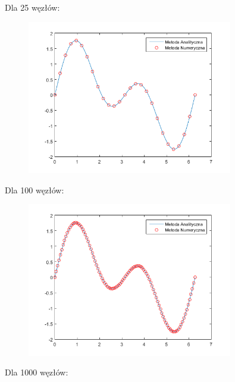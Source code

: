 Dla 25 węzłów:

\begin{figure}[!ht]
	\begin{center}
		\includegraphics[width=0.8\textwidth]{Lab3/charts/zad1/25.png}
	\end{center}
\end{figure}

\newpage

Dla 100 węzłów:
	

\begin{figure}[!ht]
	\begin{center}
		\includegraphics[width=0.8\textwidth]{Lab3/charts/zad1/100.png}
	\end{center}
\end{figure}



Dla 1000 węzłów:

